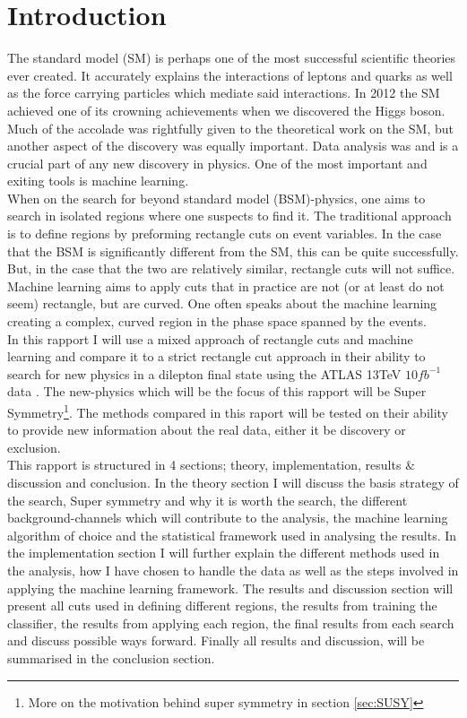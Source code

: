 \documentclass{article}
\begin{document}
\section{Introduction}
The standard model (SM) is perhaps one of the most successful scientific theories ever created. It accurately explains the interactions of leptons and quarks as well as the force carrying particles which mediate said interactions. In 2012 the SM achieved one of its crowning achievements when we discovered the Higgs boson. Much of the accolade was rightfully given to the theoretical work on the SM, but another aspect of the discovery was equally important. Data analysis was and is a crucial part of any new discovery in physics. One of the most important and exiting tools is machine learning.
\\
When on the search for beyond standard model (BSM)-physics, one aims to search in isolated regions where one suspects to find it. The traditional approach is to define regions by preforming rectangle cuts on event variables. In the case that the BSM is significantly different from the SM, this can be quite successfully. But, in the case that the two are relatively similar, rectangle cuts will not suffice. Machine learning aims to apply cuts that in practice are not (or at least do not seem) rectangle, but are curved. One often speaks about the machine learning creating a complex, curved region in the phase space spanned by the events.
\\
In this rapport I will use a mixed approach of rectangle cuts and machine learning and compare it to a strict rectangle cut approach in their ability to search for new physics in a dilepton final state using the ATLAS 13TeV $10fb^{-1}$ data \cite{ATL-OREACH-PUB-2020-001}. The new-physics which will be the focus of this rapport will be Super Symmetry\footnote{More on the motivation behind super symmetry in section \ref{sec:SUSY}}. The methods compared in this raport will be tested on their ability to provide new information about the real data, either it be discovery or exclusion.
\\
This rapport is structured in 4 sections; theory, implementation, results $\&$ discussion and conclusion. In the theory section I will discuss the basis strategy of the search, Super symmetry and why it is worth the search, the different background-channels which will contribute to the analysis, the machine learning algorithm of choice and the statistical framework used in analysing the results. In the implementation section I will further explain the different methods used in the analysis, how I have chosen to handle the data as well as the steps involved in applying the machine learning framework. The results and discussion section will present all cuts used in defining different regions, the results from training the classifier, the results from applying each region, the final results from each search and discuss possible ways forward. Finally all results and discussion, will be summarised in the conclusion section.
\end{document}
